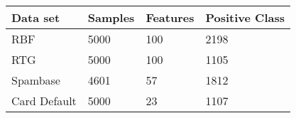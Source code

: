 \begin{tabular}{llll}
\toprule
    Data set & Samples & Features & Positive Class \\
\midrule
         RBF &    5000 &      100 &           2198 \\
         RTG &    5000 &      100 &           1105 \\
    Spambase &    4601 &       57 &           1812 \\
Card Default &    5000 &       23 &           1107 \\
\bottomrule
\end{tabular}
